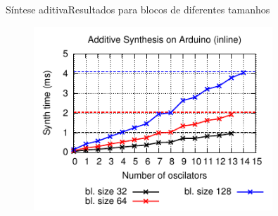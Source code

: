 \begin{frame}{Síntese aditiva}{Resultados para blocos de diferentes tamanhos}
\begin{figure}
\includegraphics[width=0.8\textwidth]{./img/sinesum-comparison.pdf}
\end{figure}
\end{frame}

